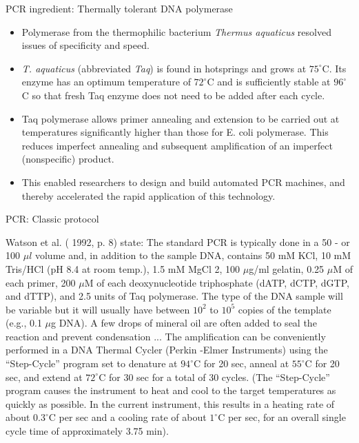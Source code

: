 \documentclass[
  ignorenonframetext,
  aspectratio=169]{beamer}
\providecommand{\tightlist}{%
  \setlength{\itemsep}{0pt}\setlength{\parskip}{0pt}}
\begin{document}
\begin{frame}{PCR ingredient: Thermally tolerant DNA polymerase}
\protect\hypertarget{pcr-ingredient-thermally-tolerant-dna-polymerase}{}
\begin{itemize}
\tightlist
\item
  Polymerase from the thermophilic bacterium \emph{Thermus aquaticus}
  resolved issues of specificity and speed.
\item
  \emph{T. aquaticus} (abbreviated \emph{Taq}) is found in hotsprings
  and grows at \(75^\circ\)C. Its enzyme has an optimum temperature of
  \(72^\circ\)C and is sufficiently stable at \(96^\circ\)C so that
  fresh Taq enzyme does not need to be added after each cycle.
\item
  Taq polymerase allows primer annealing and extension to be carried out
  at temperatures significantly higher than those for E. coli
  polymerase. This reduces imperfect annealing and subsequent
  amplification of an imperfect (nonspecific) product.
\item
  This enabled researchers to design and build automated PCR machines,
  and thereby accelerated the rapid application of this technology.
\end{itemize}
\end{frame}

\begin{frame}{PCR: Classic protocol}
\protect\hypertarget{pcr-classic-protocol}{}
\begin{block}{Watson et al. ( 1992, p. 8) state:}
The standard PCR is typically done in a 50 - or 100 $\mu l$ volume and, in addition to the sample DNA, contains 50 mM KCl, 10 mM Tris/HCl (pH 8.4 at room temp.), 1.5 mM MgCl 2, 100 $\mu$g/ml gelatin, 0.25 $\mu$M of each primer, 200 $\mu$M of each deoxynucleotide triphosphate (dATP, dCTP, dGTP, and dTTP), and 2.5 units of Taq polymerase. The type of the DNA sample will be variable but it will usually have between $10^2$ to $10^5$ copies of the template (e.g., 0.1 $\mu$g DNA). A few drops of mineral oil are often added to seal the reaction and prevent condensation ... The amplification can be conveniently performed in a DNA Thermal Cycler (Perkin -Elmer Instruments) using the “Step-Cycle” program set to denature at $94^\circ$C for 20 sec, anneal at $55^\circ$C for 20 sec, and extend at  $72^\circ$C for 30 sec for a total of 30 cycles. (The “Step-Cycle” program causes the instrument to heat and cool to the target temperatures as quickly as possible. In the current instrument, this results in a heating rate of about  $0.3^\circ$C per sec and a cooling rate of about  $1^\circ$C per sec, for an overall single cycle time of approximately 3.75 min).
\end{block}
\end{frame}
\end{document}
